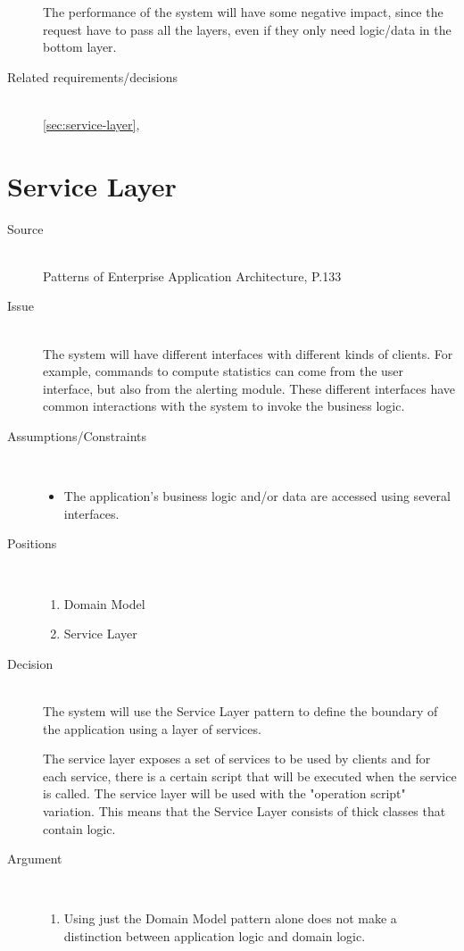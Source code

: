 \begin{description}
The performance of the system will have some negative impact, since the request have to pass all the layers, even if they only need logic/data in the bottom layer.

\item [Related requirements/decisions]~\\
\ref{sec:service-layer}, 

\end{description}

\section{Service Layer}

\begin{description}
\item [Source]~\\
Patterns of Enterprise Application Architecture, P.133 \cite{Fowler:2002:PEA:579257}

\item [Issue]~\\
The system will have different interfaces with different kinds of clients. For example, commands to compute statistics can come from the user interface, but also from the alerting module. These different interfaces have common interactions with the system to invoke the business logic.

\item [Assumptions/Constraints]~
\begin{itemize}
\item The application's business logic and/or data are accessed using several interfaces.
\end{itemize}

\item [Positions]~
\begin{enumerate}
\item Domain Model %
\item Service Layer
\end{enumerate}


\item [Decision] ~\\
The system will use the Service Layer pattern to define the boundary of the application using a layer of services.

The service layer exposes a set of services to be used by clients and for each service, there is a certain script that will be executed when the service is called. The service layer will be used with the "operation script" variation. This means that the Service Layer consists of thick classes that contain logic.
\item [Argument]~
\begin{enumerate}
\item Using just the Domain Model pattern alone does not make a distinction between application logic and domain logic.


\end{enumerate}
\end{description}
